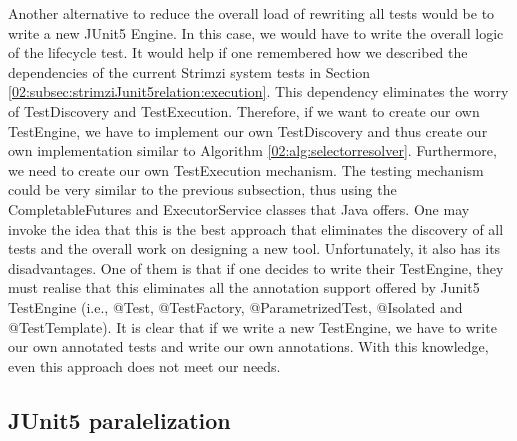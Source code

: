 Another alternative to reduce the overall load of rewriting all tests would be to write a new JUnit5 Engine.
In this case, we would have to write the overall logic of the lifecycle test.
It would help if one remembered how we described the dependencies of the current Strimzi system tests in Section \ref{02:subsec:strimziJunit5relation:execution}.
This dependency eliminates the worry of TestDiscovery and TestExecution.
Therefore, if we want to create our own TestEngine, we have to implement our own TestDiscovery and thus create our own implementation similar to Algorithm \ref{02:alg:selectorresolver}.
Furthermore, we need to create our own TestExecution mechanism.
The testing mechanism could be very similar to the previous subsection, thus using the CompletableFutures and ExecutorService classes that Java offers.
One may invoke the idea that this is the best approach that eliminates the discovery of all tests and the overall work on designing a new tool.
Unfortunately, it also has its disadvantages.
One of them is that if one decides to write their TestEngine, they must realise that this eliminates all the annotation support offered by Junit5 TestEngine (i.e., @Test, @TestFactory, @ParametrizedTest, @Isolated and @TestTemplate).
It is clear that if we write a new TestEngine, we have to write our own annotated tests and write our own annotations.
With this knowledge, even this approach does not meet our needs.


\subsection{JUnit5 paralelization}

